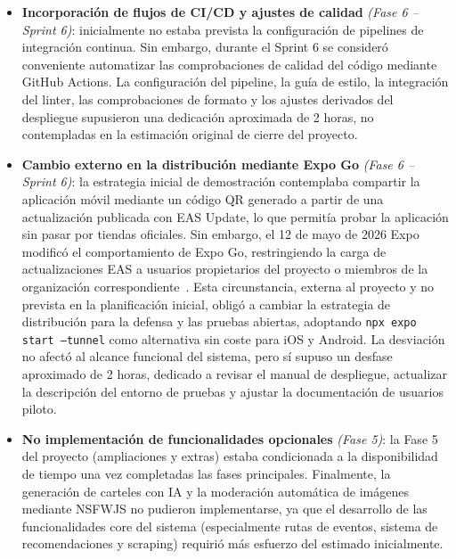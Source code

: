 \begin{itemize}
    \item \textbf{Incorporación de flujos de CI/CD y ajustes de calidad} \textit{(Fase 6 – Sprint 6)}: inicialmente no estaba prevista la configuración de pipelines de integración continua. Sin embargo, durante el Sprint 6 se consideró conveniente automatizar las comprobaciones de calidad del código mediante GitHub Actions. La configuración del pipeline, la guía de estilo, la integración del linter, las comprobaciones de formato y los ajustes derivados del despliegue supusieron una dedicación aproximada de 2 horas, no contempladas en la estimación original de cierre del proyecto.

    \item \textbf{Cambio externo en la distribución mediante Expo Go} \textit{(Fase 6 -- Sprint 6)}: la estrategia inicial de demostración contemplaba compartir la aplicación móvil mediante un código QR generado a partir de una actualización publicada con EAS Update, lo que permitía probar la aplicación sin pasar por tiendas oficiales. Sin embargo, el 12 de mayo de 2026 Expo modificó el comportamiento de Expo Go, restringiendo la carga de actualizaciones EAS a usuarios propietarios del proyecto o miembros de la organización correspondiente~\cite{expoGoLoading2026}. Esta circunstancia, externa al proyecto y no prevista en la planificación inicial, obligó a cambiar la estrategia de distribución para la defensa y las pruebas abiertas, adoptando \texttt{npx expo start --tunnel} como alternativa sin coste para iOS y Android. La desviación no afectó al alcance funcional del sistema, pero sí supuso un desfase aproximado de 2 horas, dedicado a revisar el manual de despliegue, actualizar la descripción del entorno de pruebas y ajustar la documentación de usuarios piloto.

    \item \textbf{No implementación de funcionalidades opcionales} \textit{(Fase 5)}: la Fase 5 del proyecto (ampliaciones y extras) estaba condicionada a la disponibilidad de tiempo una vez completadas las fases principales. Finalmente, la generación de carteles con IA y la moderación automática de imágenes mediante NSFWJS no pudieron implementarse, ya que el desarrollo de las funcionalidades core del sistema (especialmente rutas de eventos, sistema de recomendaciones y scraping) requirió más esfuerzo del estimado inicialmente.


\end{itemize}
